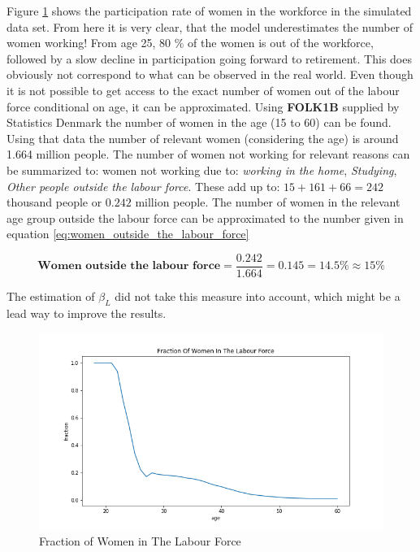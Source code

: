 Figure \ref{fig:dqi_model1_fraction_in_workforce} shows the participation rate of women in the workforce in the simulated data set. From here it is very clear, that the model underestimates the number of women working! From age 25, 80 \% of the women is out of the workforce, followed by a slow decline in participation going forward to retirement. This does obviously not correspond to what can be observed in the real world. Even though it is not possible to get access to the exact number of women out of the labour force conditional on age, it can be approximated. Using \textbf{FOLK1B} supplied by Statistics Denmark the number of women in the age (15 to 60) can be found. Using that data the number of relevant women (considering the age) is around 1.664 million people. The number of women not working for relevant reasons can be summarized to: women not working due to: \textit{working in the home}, \textit{Studying}, \textit{Other people outside the labour force}. These add up to: $15 + 161 + 66 = 242$ thousand people or $0.242$ million people. The number of women in the relevant age group outside the labour force can be approximated to the number given in equation \ref{eq:women_outside_the_labour_force}

\begin{equation}
    \label{eq:women_outside_the_labour_force}
    \textbf{Women outside the labour force} = \frac{0.242}{1.664} = 0.145 = 14.5 \% \approx 15 \%
\end{equation}

The estimation of $\beta_L$ did not take this measure into account, which might be a lead way to improve the results.

\begin{figure}
    \centering
    \includegraphics[scale=0.4]{figures/dqi_model1_women_in_labour_force_fraction.png}
    \caption{Fraction of Women in The Labour Force}
    \label{fig:dqi_model1_fraction_in_workforce}
\end{figure}

